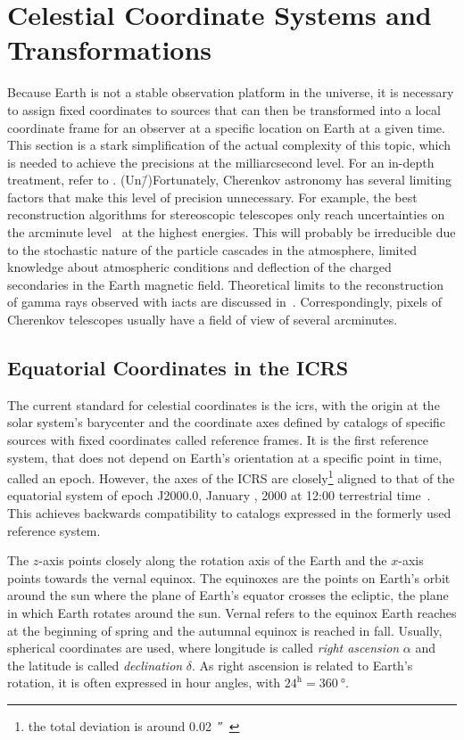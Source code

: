 \section{Celestial Coordinate Systems and Transformations}\label{sec:coordinate-transforms}
Because Earth is not a stable observation platform in the universe,
it is necessary to assign fixed coordinates to sources that can then
be transformed into a local coordinate frame for an observer at
a specific location on Earth at a given time.
This section is a stark simplification of the actual complexity of this
topic, which is needed to achieve the precisions at the milliarcsecond level.
For an in-depth treatment, refer to \cite{expl-suppl}.
(Un\=/)Fortunately, Cherenkov astronomy has several limiting factors that make this level
of precision unnecessary. 
For example, the best reconstruction algorithms for stereoscopic telescopes
only reach uncertainties on the arcminute level~\cite{cta-performance} at the highest energies. 
This will probably be irreducible due to the stochastic nature of the particle cascades
in the atmosphere, limited knowledge about atmospheric conditions and deflection
of the charged secondaries in the Earth magnetic field.
Theoretical limits to the reconstruction of gamma rays observed with \glspl{iact} are discussed in~\cite{iact-limits}.
Correspondingly, pixels of Cherenkov telescopes usually have a field of view of several arcminutes.

\subsection{Equatorial Coordinates in the ICRS}

The current standard for celestial coordinates is the \gls{icrs},
with the origin at the solar system's barycenter and the coordinate axes defined
by catalogs of specific sources with fixed coordinates called reference frames.
It is the first reference system, that does not depend on Earth's orientation
at a specific point in time, called an epoch.
However, the axes of the ICRS are closely\footnote{the total deviation is around \SI{0.02}{\arcsecond}~\cite[105]{expl-suppl}} aligned to that of the equatorial
system of epoch {\lining J2000.0}, January , 2000 at 12:00 terrestrial time~\cite[Chapter~4]{expl-suppl}.
This achieves backwards compatibility to catalogs expressed in the formerly used reference system.

The $z$-axis points closely along the rotation axis of the Earth and
the $x$-axis points towards the vernal equinox.
The equinoxes are the points on Earth's orbit around the sun
where the plane of Earth's equator crosses the ecliptic, the plane
in which Earth rotates around the sun.
Vernal refers to the equinox Earth reaches at the beginning of spring and the
autumnal equinox is reached in fall.
Usually, spherical coordinates are used, where longitude is called \emph{right ascension} $α$ and the latitude is called \emph{declination} $δ$. 
As right ascension is related to Earth's rotation, it is often expressed in hour angles,
with $24^{\mathrm{h}} = \SI{360}{\degree}$.

